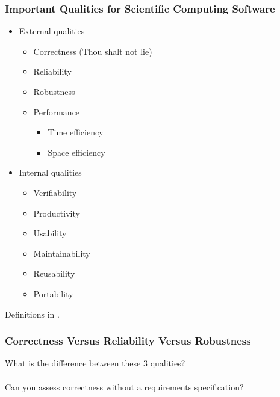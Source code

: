 \documentclass[t,12pt,numbers,fleqn]{beamer}
\begin{document}
\begin{frame}

\frametitle{Important Qualities for Scientific Computing Software}

\begin{itemize}

\item External qualities
\begin{itemize}
\item Correctness (Thou shalt not lie)
\item Reliability
\item Robustness
\item Performance
\begin{itemize}
\item Time efficiency
\item Space efficiency
\end{itemize}
\end{itemize}

\item Internal qualities
\begin{itemize}
\item Verifiability
\item Productivity
\item Usability
\item Maintainability
\item Reusability
\item Portability
\end{itemize}

\end{itemize}

Definitions in \cite{GhezziEtAl2003}.

\end{frame}


\begin{frame}
\frametitle{Correctness Versus Reliability Versus Robustness}

What is the difference between these 3 qualities?\\
~\\
Can you assess correctness without a requirements specification?

\end{frame}
\end{document}
